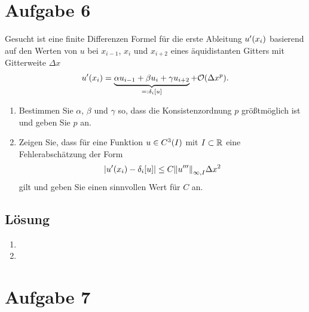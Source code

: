 \documentclass{exercise}
\begin{document}
    \section*{Aufgabe 6}
    
    \begin{problem}
        Gesucht ist eine finite Differenzen Formel für die erste Ableitung \(u'\parentheses*{x_i}\) basierend auf den Werten von \(u\) bei \(x_{i - 1}\), \(x_i\) und \(x_{i + 2}\) eines äquidistanten Gitters mit Gitterweite \(\Delta x\)
        \[
            u'\parentheses*{x_i} = \underbrace{\alpha u_{i - 1} + \beta u_i + \gamma u_{i + 2}}_{=: \delta_i\brackets*{u}} + \mathcal{O}\parentheses*{\Delta x^p}.
        \]
        \begin{enumerate}
            \item Bestimmen Sie \(\alpha\), \(\beta\) und \(\gamma\) so, dass die Konsistenzordnung \(p\) größtmöglich ist und geben Sie \(p\) an.
            \item Zeigen Sie, dass für eine Funktion \(u \in C^3\parentheses*{I}\) mit \(I \subset \mathbb{R}\) eine Fehlerabschätzung der Form
            \[
                \absolute*{u'\parentheses*{x_i} - \delta_i\brackets*{u}} \le C\norm*{u'''}_{\infty, I}\Delta x^2
            \]
            gilt und geben Sie einen sinnvollen Wert für \(C\) an.
        \end{enumerate}
    \end{problem}
    
    \subsection*{Lösung}
    \begin{enumerate}
        \item
        \item
    \end{enumerate}


    \section*{Aufgabe 7}
    
\end{document}
